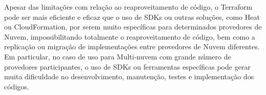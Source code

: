 \documentclass[12pt]{article}
\begin{document}
	Apesar das limitações com relação ao reaproveitamento de código, o Terraform pode ser mais eficiente e eficaz que o uso de SDKs ou outras soluções, como Heat ou CloudFormation, por serem muito específicas para determinados provedores de Nuvem, impossibilitando totalmente o reaproveitamento de código, bem como a replicação ou migração de implementações entre provedores de Nuvem diferentes. Em particular, no caso de uso para Multi-nuvem com grande número de provedores participantes, o uso de SDKs ou ferramentas específicas pode gerar muita dificuldade no desenvolvimento, manutenção, testes e implementação dos códigos.
	
	
	\nocite{Bond:2015}
	
	\newpage

		
	
	
\end{document}
